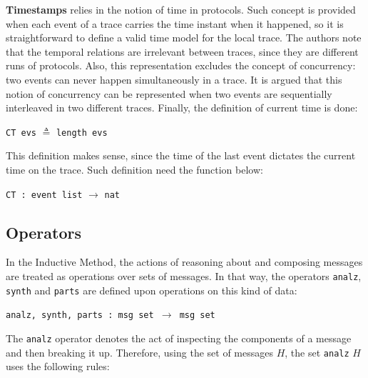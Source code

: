 \textbf{Timestamps} relies in the notion of time in protocols. Such concept is provided when each event of a trace carries the time instant when it happened, so it is straightforward to define a valid time model for the local trace. The authors note that the temporal relations are irrelevant between traces, since they are different runs of protocols. Also, this representation excludes the concept of concurrency: two events can never happen simultaneously in a trace. It is argued that this notion of concurrency can be represented when two events are sequentially interleaved in two different traces. Finally, the definition of current time is done:

\begin{center}
  \texttt{CT evs} $\triangleq$ \texttt{length evs}
\end{center}

This definition makes sense, since the time of the last event dictates the current time on the trace. Such definition need the function below:

\begin{center}
  \texttt{CT : event list} $\longrightarrow$ \texttt{nat}
\end{center}




\subsection{Operators}
In the Inductive Method, the actions of reasoning about and composing messages are treated as operations over sets of messages. In that way, the operators \texttt{analz}, \texttt{synth} and \texttt{parts} are defined upon operations on this kind of data:

\begin{center}
  \texttt{analz, synth, parts : msg set $\longrightarrow$ msg set}
\end{center}

The \texttt{analz} operator denotes the act of inspecting the components of a message and then breaking it up. Therefore, using the set of messages $H$, the set \texttt{analz} $H$ uses the following rules:

